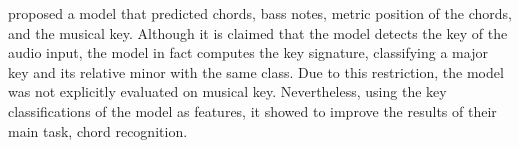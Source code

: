 \textcite{mauch2010simultaneous} proposed a model that
predicted chords, bass notes, metric position of the chords,
and the musical key. Although it is claimed that the model
detects the key of the audio input, the model in fact
computes the key signature, classifying a major key and its
relative minor with the same class. Due to this restriction,
the model was not explicitly evaluated on musical key.
Nevertheless, using the key classifications of the model as
features, it showed to improve the results of their main
task, chord recognition.













